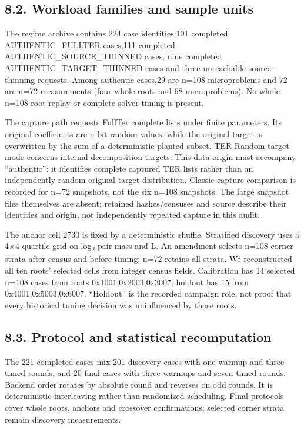 \documentclass[10pt,letterpaper]{article}
\begin{document}
\subsection*{8.2. Workload families and sample units}

The regime archive contains 224 case identities:101 completed AUTHENTIC\_FULLTER cases,111 completed AUTHENTIC\_SOURCE\_THINNED cases, nine completed AUTHENTIC\_TARGET\_THINNED cases and three unreachable source-thinning requests. Among authentic cases,29 are n=108 microproblems and 72 are n=72 measurements (four whole roots and 68 microproblems). No whole n=108 root replay or complete-solver timing is present.


The capture path requests FullTer complete lists under finite parameters. Its original coefficients are n-bit random values, while the original target is overwritten by the sum of a deterministic planted subset. TER Random target mode concerns internal decomposition targets. This data origin must accompany ``authentic'': it identifies complete captured TER lists rather than an independently random original target distribution. Classic-capture comparison is recorded for n=72 snapshots, not the six n=108 snapshots. The large snapshot files themselves are absent; retained hashes/censuses and source describe their identities and origin, not independently repeated capture in this audit.


The anchor cell 2730 is fixed by a deterministic shuffle. Stratified discovery uses a 4\ensuremath{\times}4 quartile grid on log\textsubscript{2} pair mass and L. An amendment selects n=108 corner strata after census and before timing; n=72 retains all strata. We reconstructed all ten roots' selected cells from integer census fields. Calibration has 14 selected n=108 cases from roots 0x1001,0x2003,0x3007; holdout has 15 from 0x4001,0x5003,0x6007. ``Holdout'' is the recorded campaign role, not proof that every historical tuning decision was uninfluenced by those roots.


\subsection*{8.3. Protocol and statistical recomputation}

The 221 completed cases mix 201 discovery cases with one warmup and three timed rounds, and 20 final cases with three warmups and seven timed rounds. Backend order rotates by absolute round and reverses on odd rounds. It is deterministic interleaving rather than randomized scheduling. Final protocols cover whole roots, anchors and crossover confirmations; selected corner strata remain discovery measurements.
\end{document}
